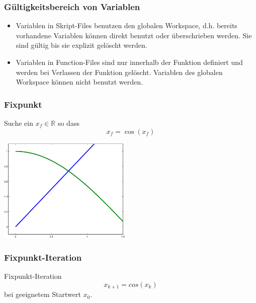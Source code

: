 %
%
\begin{frame}[fragile]\frametitle{Gültigkeitsbereich von Variablen}
\begin{itemize}
\item \alert{Variablen in Skript-Files} benutzen den globalen Workspace,
  d.h. bereits vorhandene Variablen können direkt benutzt oder
  überschrieben werden. Sie sind gültig bis sie explizit gelöscht
  werden.
\item \alert{Variablen in Function-Files} sind nur innerhalb der
  Funktion definiert und werden bei Verlassen der Funktion
  gelöscht. Variablen des globalen Workspace können nicht benutzt
  werden. 
\end{itemize}
\end{frame}
%
%
\begin{frame}[fragile]\frametitle{Fixpunkt}
Suche ein $x_f \in \mathbb{R}$ so dass
\[ x_f = \cos (x_f ) \]
\begin{center}
\includegraphics[height=5cm]{./figures/fixpunkt}
\end{center}
\end{frame}
%
%
\begin{frame}[fragile]\frametitle{Fixpunkt-Iteration}
Fixpunkt-Iteration 
\[ x_{k+1}=cos(x_k) \]
bei geeignetem Startwert $x_0$.  \\
\\
\end{frame}

